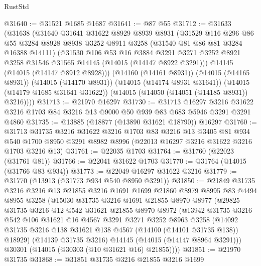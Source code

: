 \begin{lexlean}{RustStd}
\begin{coremodule}
@31640 := @31521 @1685 @1687
@31641 := @87 @55
@31712 := @31633
    (@31638
      (@31640
        @31641
        @31622
        @8929
        @8939
        @8931
        (@31529
          @116
          @296
          @86
          @55
          @3284
          @8928
          @8938
          @3252
          @8911
          @3258
          (@31540 @81 @86 @81 @3284 @16388 @14111)
          (@31530
            @106
            @53
            @16
            @3884
            @3291
            @3271
            @3252
            @8921
            @3258
            @31546
            @31565
            @14145
            (@14015 (@14147 @8922 @3291)))
          @14145
          (@14015 (@14147 @8912 @8928)))
        (@14160 (@14161 @8931))
        (@14015 (@14165 @8931))
        (@14015 (@14170 @8931))
        (@14015 (@14174 @8931 @31641))
        (@14015 (@14179 @1685 @31641 @31622))
        (@14015 (@14050 (@14051 (@14185 @8931)) @3216))))
@31713 := @21970 @16297
@31730 := @31713
    @16297
    @3216
    @31622
    @3216
    @1703
    @84
    @3216
    @13
    @9000
    @50
    @939
    @83
    @683
    @5946
    @3291
    @3291
    @4860
@31735 := @13885 (@18877 (@13890 @31621 @18790)) @16297
@31760 := @31713
    @31735
    @3216
    @31622
    @3216
    @1703
    @83
    @3216
    @13
    @3405
    @81
    @934
    @540
    @1700
    @8950
    @3291
    @8982
    @8996
    (@22013 @16297 @3216 @31622 @3216 @1703 @3216 @13)
@31761 := @22035 @1703
@31764 := @31760 (@22023 (@31761 @81))
@31766 := @22041 @31622 @1703
@31770 := @31764 (@14015 (@31766 @83 @934))
@31773 := @22049 @16297 @31622 @3216
@31779 := @31770 (@13913 (@31773 @934 @540 @8950 @3291))
@31850 := @21849
    @31735
    @3216
    @3216
    @13
    @21855
    @3216
    @1691
    @1699
    @21860
    @8979
    @8995
    @83
    @4494
    @8955
    @3258
    (@15030
      @31735
      @3216
      @1691
      @21855
      @8970
      @8977
      (@29825
        @31735
        @3216
        @12
        @542
        @31621
        @21855
        @8970
        @8972
        (@13942
          @31735
          @3216
          @542
          @106
          @31621
          @16
          @4567
          @3291
          @3271
          @3252
          @8963
          @3258
          (@14092 @31735 @3216 @138 @31621 @138 @4567 (@14100 (@14101 @31735 @138)) @18929)
          (@14139 @31735 @3216)
          @14145
          (@14015 (@14147 @8964 @3291)))
        @30301
        (@14015 (@30303 (@10 @31621 @16) @21855))))
@31851 := @21970 @31735
@31868 := @31851
    @31735
    @3216
    @21855
    @3216
    @1699

\end{coremodule}
\end{lexlean}

